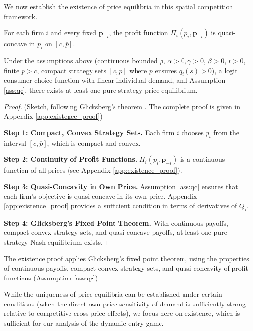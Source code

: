 \documentclass{article}
\begin{document}
We now establish the existence of price equilibria in this spatial competition framework.

\begin{assumption}\label{ass:qc}
  For each firm $i$ and every fixed $\mathbf{p}_{-i}$, the profit function $\Pi_i(p_i,\mathbf{p}_{-i})$ is quasi-concave in $p_i$ on $[c,\overline{p}]$.
\end{assumption}

\begin{theorem}
  \label{thm:existence}
  Under the assumptions above (continuous bounded $\rho$, $\alpha>0, \gamma>0$, $\beta>0$, $t>0$, finite $\overline{p} > c$, compact strategy sets $[c,\overline{p}]$ where $\overline{p}$ ensures $q_i(s)>0$), a logit consumer choice function with linear individual demand, and Assumption \ref{ass:qc}, there exists at least one pure-strategy price equilibrium.
\end{theorem}

\begin{proof}
  (Sketch, following Glicksberg's theorem \citep{glicksberg1952}. The complete proof is given in Appendix \ref{app:existence_proof})

  \noindent
  \textbf{Step 1: Compact, Convex Strategy Sets.}
  Each firm $i$ chooses $p_i$ from the interval $[c, \overline{p}]$, which is compact and convex.

  \noindent
  \textbf{Step 2: Continuity of Profit Functions.}
  $\Pi_i(p_i, \mathbf{p}_{-i})$ is a continuous function of all prices (see Appendix \ref{app:existence_proof}).

  \noindent
  \textbf{Step 3: Quasi-Concavity in Own Price.}
  Assumption \ref{ass:qc} ensures that each firm's objective is quasi-concave in its own price. Appendix \ref{app:existence_proof} provides a sufficient condition in terms of derivatives of $Q_i$.

  \noindent
  \textbf{Step 4: Glicksberg's Fixed Point Theorem.}
  With continuous payoffs, compact convex strategy sets, and quasi-concave payoffs, at least one pure-strategy Nash equilibrium exists.
\end{proof}

The existence proof applies Glicksberg's fixed point theorem, using the properties of continuous payoffs, compact convex strategy sets, and quasi-concavity of profit functions (Assumption \ref{ass:qc}).

While the uniqueness of price equilibria can be established under certain conditions (when the direct own-price sensitivity of demand is sufficiently strong relative to competitive cross-price effects), we focus here on existence, which is sufficient for our analysis of the dynamic entry game.
\end{document}

